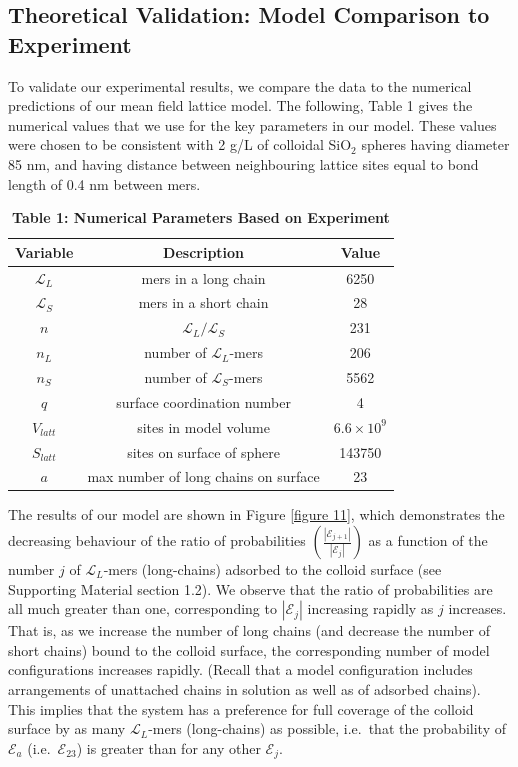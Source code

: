 \documentclass[twoside,twocolumn,9pt]{article}
\newcommand{\leng}{\mathcal{L}}
\begin{document}
\subsection{Theoretical Validation: Model Comparison to Experiment}   %
    \label{sec-res-theor}

To validate our experimental results, 
we compare the data to the numerical predictions of our mean field lattice model.
The following, Table 1 gives the numerical values that we use for the key parameters in our model.
These values were chosen to be consistent with 
2 g/L of colloidal SiO$_2$ spheres having diameter 85 nm, and having distance between neighbouring lattice sites equal to bond length of 0.4 nm between mers.

\begin{table}
\begin{center}
\begin{tabular}{|c|c|c|}
    \hline
     Variable & Description  & Value   \\ \hline\hline
    $\leng_L$ &  mers in a long chain &  6250 \\  
    $\leng_S$ & mers in a short chain &28  \\
    $n$ & $\leng_L/\leng_S$  &   231  \\
    $n_L$ & number of $\leng_L$-mers & 206  \\
    $n_S$  & number of $\leng_S$-mers & 5562  \\
    $q$   & surface coordination number & 4  \\
    $V_{latt}$  & sites in model volume & $6.6\times          10^{9}$\\
    $S_{latt}$  & sites on surface of sphere  & 143750  \\
    $a$  & max number of long chains on surface & 23 \\
      \hline
\end{tabular}
\end{center}
\caption*{\textbf{Table 1: Numerical Parameters Based on Experiment}}
\end{table}

The results of our model are shown in Figure \ref{figure 11}, which demonstrates the decreasing behaviour of the ratio of probabilities 
$\left(\frac{|\mathcal{E}_{j+1}|}{|\mathcal{E}_j|}\right)$ as a function of the number $j$ of $\leng_L$-mers (long-chains) adsorbed to the colloid surface (see Supporting Material section 1.2). We observe that the ratio of probabilities are all much greater than one, corresponding to $|\mathcal{E}_j|$ increasing rapidly as $j$ increases. That is, as we increase the number of long chains (and decrease the number of short chains) bound to the colloid surface, the corresponding number of model configurations increases rapidly.  (Recall that a model configuration includes arrangements of unattached chains in solution as well as of adsorbed chains). This implies that the system has a preference for full coverage of the colloid surface by as many $\leng_L$-mers (long-chains) as possible, i.e.\ that the probability of $\mathcal{E}_a$ (i.e.\ $\mathcal{E}_{23}$) is greater than for any other $\mathcal{E}_j$.  
\end{document}
